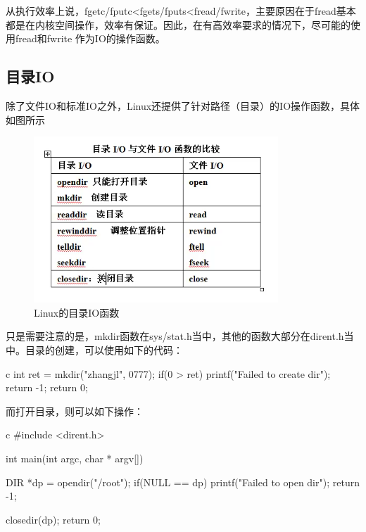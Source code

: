 从执行效率上说，fgetc/fputc<fgets/fputs<fread/fwrite，主要原因在于fread基本都是在内核空间操作，效率有保证。因此，在有高效率要求的情况下，尽可能的使用fread和fwrite
作为IO的操作函数。

\subsection{目录IO}
除了文件IO和标准IO之外，Linux还提供了针对路径（目录）的IO操作函数，具体如图所示
\begin{figure}[H]
  \centering
  \includegraphics[scale=1]{dirio.png}
  \caption{Linux的目录IO函数}
  \label{fig:dirio}
\end{figure}

只是需要注意的是，mkdir函数在sys/stat.h当中，其他的函数大部分在dirent.h当中。目录的创建，可以使用如下的代码：
\begin{code-block}{c}
int ret = mkdir("zhangjl", 0777);
if(0 > ret)
{
        printf("Failed to create dir\n");
        return -1;
}
return 0;
\end{code-block}

而打开目录，则可以如下操作：
\begin{code-block}{c}
#include <dirent.h>

int main(int argc, char * argv[])
{
        DIR *dp = opendir("/root");
        if(NULL ==  dp)
        {
                printf("Failed to open dir\n");
                return -1;
        }

        closedir(dp);
        return 0;
}
\end{code-block}

